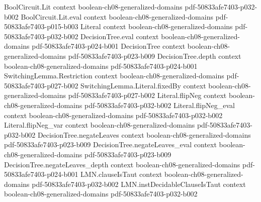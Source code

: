 \begin{theorem}
\label{BooleanAnalysis.influence_eq_sum_fourier}
\leanok
{}
\proofstep
  {BoolCircuit.Lit}
  {context}
  {boolean-ch08-generalized-domains}
  {pdf-50833afe7403-p032-b002}
\proofstep
  {BoolCircuit.Lit.eval}
  {context}
  {boolean-ch08-generalized-domains}
  {pdf-50833afe7403-p015-b003}
\proofstep
  {Literal}
  {context}
  {boolean-ch08-generalized-domains}
  {pdf-50833afe7403-p032-b002}
\proofstep
  {DecisionTree.eval}
  {context}
  {boolean-ch08-generalized-domains}
  {pdf-50833afe7403-p024-b001}
\proofstep
  {DecisionTree}
  {context}
  {boolean-ch08-generalized-domains}
  {pdf-50833afe7403-p023-b009}
\proofstep
  {DecisionTree.depth}
  {context}
  {boolean-ch08-generalized-domains}
  {pdf-50833afe7403-p024-b001}
\proofstep
  {SwitchingLemma.Restriction}
  {context}
  {boolean-ch08-generalized-domains}
  {pdf-50833afe7403-p027-b002}
\proofstep
  {SwitchingLemma.Literal.fixedBy}
  {context}
  {boolean-ch08-generalized-domains}
  {pdf-50833afe7403-p027-b002}
\proofstep
  {Literal.flipNeg}
  {context}
  {boolean-ch08-generalized-domains}
  {pdf-50833afe7403-p032-b002}
\proofstep
  {Literal.flipNeg_eval}
  {context}
  {boolean-ch08-generalized-domains}
  {pdf-50833afe7403-p032-b002}
\proofstep
  {Literal.flipNeg_var}
  {context}
  {boolean-ch08-generalized-domains}
  {pdf-50833afe7403-p032-b002}
\proofstep
  {DecisionTree.negateLeaves}
  {context}
  {boolean-ch08-generalized-domains}
  {pdf-50833afe7403-p023-b009}
\proofstep
  {DecisionTree.negateLeaves_eval}
  {context}
  {boolean-ch08-generalized-domains}
  {pdf-50833afe7403-p023-b009}
\proofstep
  {DecisionTree.negateLeaves_depth}
  {context}
  {boolean-ch08-generalized-domains}
  {pdf-50833afe7403-p024-b001}
\proofstep
  {LMN.clauseIsTaut}
  {context}
  {boolean-ch08-generalized-domains}
  {pdf-50833afe7403-p032-b002}
\proofstep
  {LMN.instDecidableClauseIsTaut}
  {context}
  {boolean-ch08-generalized-domains}
  {pdf-50833afe7403-p032-b002}

\end{theorem}
